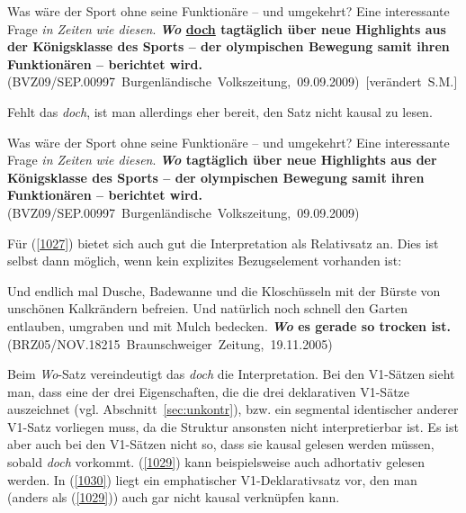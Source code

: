 {\begin{exe}
	\ex\label{1026}
	 \scriptsize 
	Was wäre der Sport ohne seine Funktionäre – und umgekehrt? Eine interessante Frage \emph{in Zeiten} \emph{wie diesen}. \textbf{\textit{Wo} \underline{doch} 		tagtäglich über neue Highlights aus der \glqq Königsklasse des Sports\grqq{} – der olympischen Bewegung samit ihren Funktionären – berichtet wird.}
	\newline
	\hbox{}\hfill\hbox {(BVZ09/SEP.00997 Burgenländische Volkszeitung, 09.09.2009) $[$verändert S.M.$]$}
\end{exe}	
Fehlt das \textit{doch}, ist man allerdings eher bereit, den Satz nicht kausal zu lesen. 

\begin{exe}
	\ex\label{1027}
	\scriptsize 
	Was wäre der Sport ohne seine Funktionäre – und umgekehrt? Eine interessante Frage \emph{in Zeiten} \emph{wie diesen}. \textbf{\textit{Wo} tagtäglich über 		neue Highlights aus der \glqq Königsklasse des Sports\grqq{} – der olympischen Bewegung samit ihren Funktionären – berichtet wird.}
	\newline
	\hbox{}\hfill\hbox {(BVZ09/SEP.00997 Burgenländische Volkszeitung, 09.09.2009)}
\end{exe}                                    
Für (\ref{1027}) bietet sich auch gut die Interpretation als Relativsatz an. Dies ist selbst dann möglich, wenn kein explizites Bezugselement vorhanden ist:

\begin{exe}
	\ex\label{1028}
	 \scriptsize 
	Und endlich mal Dusche, Badewanne und die Kloschüsseln mit der Bürste von unschönen Kalkrändern befreien. Und natürlich noch schnell den Garten 			entlauben, umgraben und mit Mulch bedecken. \textbf{\textit{Wo} es gerade so trocken ist.}    
	\hfill\hbox {(BRZ05/NOV.18215 Braunschweiger Zeitung, 19.11.2005)}
\end{exe}                                                                        
Beim \textit{Wo}-Satz vereindeutigt das \textit{doch} die Interpretation. Bei den V1-Sätzen sieht man, dass eine der drei Eigenschaften, die die drei deklarativen V1-Sätze aus\-zeichnet (vgl. Abschnitt~\ref{sec:unkontr}), bzw. ein segmental identischer anderer V1-Satz vorliegen muss, da die Struktur ansonsten nicht interpretierbar ist. Es ist aber auch bei den V1-Sätzen nicht so, dass sie kausal gelesen werden müssen, sobald \textit{doch} vorkommt. (\ref{1029}) kann beispielsweise auch adhortativ  gelesen werden. In (\ref{1030}) liegt ein  emphatischer V1-Deklarativsatz vor, den man (anders als (\ref{1029})) auch gar nicht kausal verknüpfen kann.

}
